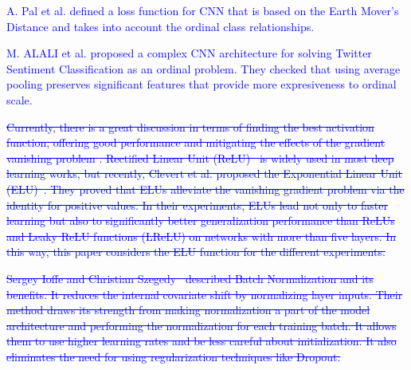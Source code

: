 \documentclass[journal]{IEEEtran}
\begin{document}
	\textcolor{blue}{A. Pal et al. \cite{pal2018severity} defined a loss function for CNN that is based on the Earth Mover's Distance and takes into account the ordinal class relationships.}
	
	\textcolor{blue}{M. ALALI et al. \cite{alali2018multi} proposed a complex CNN architecture for solving Twitter Sentiment Classification as an ordinal problem. They checked that using average pooling preserves significant features that provide more expresiveness to ordinal scale.}
	
	\textcolor{blue}{\sout{Currently, there is a great discussion in terms of finding the best activation function, offering good performance and mitigating the effects of the gradient vanishing problem \cite{bengio1994learning,pascanu2013difficulty}. Rectified Linear Unit (ReLU)~\cite{nair2010rectified} is widely used in most deep learning works, but recently, Clevert et al. proposed the Exponential Linear Unit (ELU)~\cite{clevert2015fast}. They proved that ELUs alleviate the vanishing gradient problem via the identity for positive values. In their experiments, ELUs lead not only to faster learning but also to significantly better generalization performance than ReLUs and Leaky ReLU functions (LReLU) on networks with more than five layers. In this way, this paper considers the ELU function for the different experiments.}}
	
	\textcolor{blue}{\sout{Sergey Ioffe and Christian Szegedy~\cite{ioffe2015batch} described Batch Normalization and its benefits. It reduces the internal covariate shift by normalizing layer inputs. Their method draws its strength from making normalization a part of the model architecture and performing the normalization for each training batch. It allows them to use higher learning rates and be less careful about initialization. It also eliminates the need for using regularization techniques like Dropout.}}
	
\end{document}
